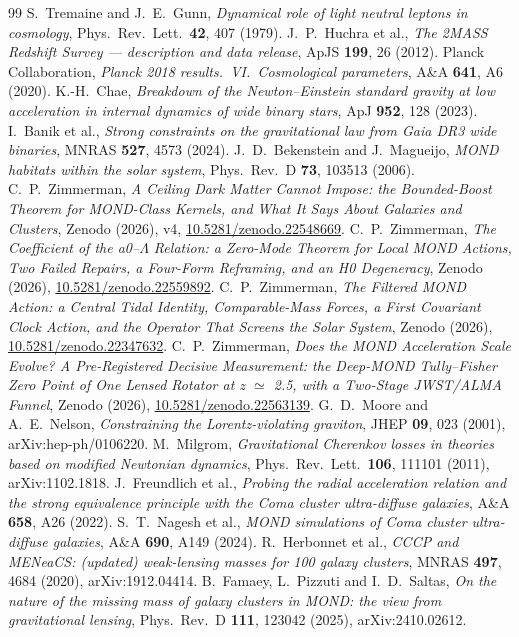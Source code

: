 \documentclass[11pt,letterpaper]{article}
\begin{document}
\begin{thebibliography}{99}
 S.\ Tremaine and J.\ E.\ Gunn, \emph{Dynamical role of light neutral leptons in cosmology}, Phys.\ Rev.\ Lett.\ \textbf{42}, 407 (1979).
 J.\ P.\ Huchra et al., \emph{The 2MASS Redshift Survey --- description and data release}, ApJS \textbf{199}, 26 (2012).
 Planck Collaboration, \emph{Planck 2018 results.\ VI.\ Cosmological parameters}, A\&A \textbf{641}, A6 (2020).
 K.-H.\ Chae, \emph{Breakdown of the Newton--Einstein standard gravity at low acceleration in internal dynamics of wide binary stars}, ApJ \textbf{952}, 128 (2023).
 I.\ Banik et al., \emph{Strong constraints on the gravitational law from Gaia DR3 wide binaries}, MNRAS \textbf{527}, 4573 (2024).
 J.\ D.\ Bekenstein and J.\ Magueijo, \emph{MOND habitats within the solar system}, Phys.\ Rev.\ D \textbf{73}, 103513 (2006).
 C.\ P.\ Zimmerman, \emph{A Ceiling Dark Matter Cannot Impose: the Bounded-Boost Theorem for MOND-Class Kernels, and What It Says About Galaxies and Clusters}, Zenodo (2026), v4, \href{https://doi.org/10.5281/zenodo.22548669}{10.5281/zenodo.22548669}.
 C.\ P.\ Zimmerman, \emph{The Coefficient of the a0--$\Lambda$ Relation: a Zero-Mode Theorem for Local MOND Actions, Two Failed Repairs, a Four-Form Reframing, and an H0 Degeneracy}, Zenodo (2026), \href{https://doi.org/10.5281/zenodo.22559892}{10.5281/zenodo.22559892}.
 C.\ P.\ Zimmerman, \emph{The Filtered MOND Action: a Central Tidal Identity, Comparable-Mass Forces, a First Covariant Clock Action, and the Operator That Screens the Solar System}, Zenodo (2026), \href{https://doi.org/10.5281/zenodo.22347632}{10.5281/zenodo.22347632}.
 C.\ P.\ Zimmerman, \emph{Does the MOND Acceleration Scale Evolve? A Pre-Registered Decisive Measurement: the Deep-MOND Tully--Fisher Zero Point of One Lensed Rotator at z $\simeq$ 2.5, with a Two-Stage JWST/ALMA Funnel}, Zenodo (2026), \href{https://doi.org/10.5281/zenodo.22563139}{10.5281/zenodo.22563139}.
 G.\ D.\ Moore and A.\ E.\ Nelson, \emph{Constraining the Lorentz-violating graviton}, JHEP \textbf{09}, 023 (2001), arXiv:hep-ph/0106220.
 M.\ Milgrom, \emph{Gravitational Cherenkov losses in theories based on modified Newtonian dynamics}, Phys.\ Rev.\ Lett.\ \textbf{106}, 111101 (2011), arXiv:1102.1818.
 J.\ Freundlich et al., \emph{Probing the radial acceleration relation and the strong equivalence principle with the Coma cluster ultra-diffuse galaxies}, A\&A \textbf{658}, A26 (2022).
 S.\ T.\ Nagesh et al., \emph{MOND simulations of Coma cluster ultra-diffuse galaxies}, A\&A \textbf{690}, A149 (2024).
 R.\ Herbonnet et al., \emph{CCCP and MENeaCS: (updated) weak-lensing masses for 100 galaxy clusters}, MNRAS \textbf{497}, 4684 (2020), arXiv:1912.04414.
 B.\ Famaey, L.\ Pizzuti and I.\ D.\ Saltas, \emph{On the nature of the missing mass of galaxy clusters in MOND: the view from gravitational lensing}, Phys.\ Rev.\ D \textbf{111}, 123042 (2025), arXiv:2410.02612.
\end{thebibliography}
\end{document}
